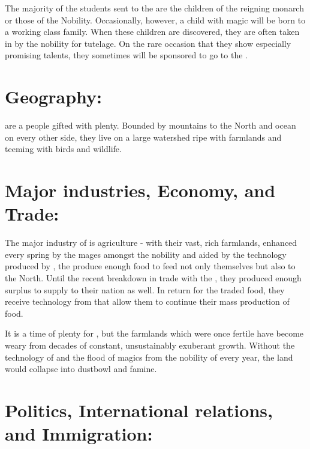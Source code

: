 \documentclass[blue]{GL2020}
\begin{document}
The majority of the students sent to the \pSchool{} are the children of the reigning monarch or those of the Nobility. Occasionally, however, a child with magic will be born to a working class family.  When these children are discovered, they are often taken in by the nobility for tutelage.  On the rare occasion that they show especially promising talents, they sometimes will be sponsored to go to the \pSchool{}.


\section*{Geography:}

\pSunCh{} are a people gifted with plenty.  Bounded by mountains to the North and ocean on every other side, they live on a large watershed ripe with farmlands and teeming with birds and wildlife.  


\section*{Major industries, Economy, and Trade:}

The major industry of \pFarm{} is agriculture - with their vast, rich farmlands, enhanced every spring by the mages amongst the nobility and aided by the technology produced by \pTech{}, the \pFarmers{} produce enough food to feed not only themselves but also  \pCreators{} to the North.  Until the recent breakdown in trade with the \pVikings{}, they produced enough surplus to supply to their nation as well.  In return for the traded food, they receive technology from \pCreators{} that allow them to continue their mass production of food. %

It is a time of plenty for \pSunCh{}, but the farmlands which were once fertile have become weary from decades of constant, unsustainably exuberant growth.  Without the technology of \pTech{} and the flood of magics from the nobility of \pFarm{} every year, the land would collapse into dustbowl and famine.

\section*{Politics, International relations, and Immigration:}
\end{document}
